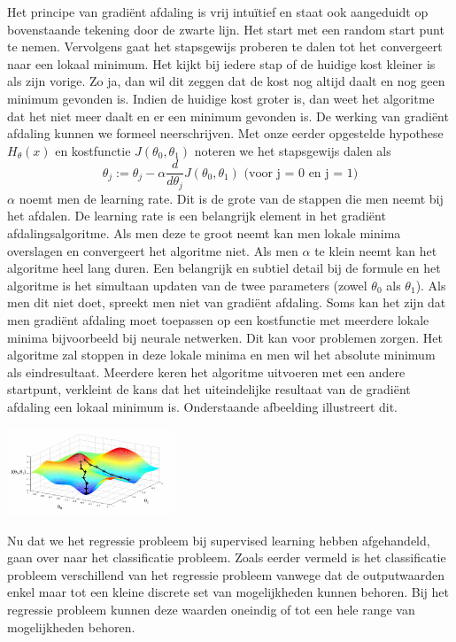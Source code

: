%
 Het principe van gradi\"ent afdaling is vrij intu\"itief en staat ook aangeduidt op bovenstaande tekening door de zwarte lijn. Het start met een random start punt te nemen. Vervolgens gaat het stapsgewijs proberen te dalen tot het convergeert naar een lokaal minimum. Het kijkt bij iedere stap of de huidige kost kleiner is als zijn vorige. Zo ja, dan wil dit zeggen dat de kost nog altijd daalt en nog geen minimum gevonden is. Indien de huidige kost groter is, dan weet het algoritme dat het niet meer daalt en er een minimum gevonden is.
\newline
De werking van gradi\"ent afdaling kunnen we formeel neerschrijven. Met onze eerder opgestelde hypothese $H_{\theta}(x)$ en kostfunctie $J(\theta_{0},\theta_{1})$ noteren we het stapsgewijs dalen als \\
\[ \theta_{j} := \theta_{j} - \alpha\frac{d}{d\theta_{j}}J(\theta_{0},\theta_{1})   \text{  (voor j = 0 en j = 1)}\] 
\newline
$\alpha$ noemt men de learning rate. Dit is de grote van de stappen die men neemt bij het afdalen. De learning rate is een belangrijk element in het gradi\"ent afdalingsalgoritme. Als men deze te groot neemt kan men lokale minima overslagen en convergeert het algoritme niet. Als men $\alpha$  te klein neemt kan het algoritme heel lang duren. 
\newline
Een belangrijk en subtiel detail bij de formule en het algoritme is het simultaan updaten van de twee parameters (zowel $\theta_{0}$ als $\theta_{1}$). Als men dit niet doet, spreekt men niet van gradi\"ent afdaling.
\newline
Soms kan het zijn dat men gradi\"ent afdaling moet toepassen op een kostfunctie met meerdere lokale minima bijvoorbeeld bij neurale netwerken. Dit kan voor problemen zorgen. Het algoritme zal stoppen in deze lokale minima en men wil het absolute minimum als eindresultaat. Meerdere keren het algoritme uitvoeren met een andere startpunt, verkleint de kans dat het uiteindelijke resultaat van de gradi\"ent afdaling een lokaal minimum is. Onderstaande afbeelding illustreert dit.
\begin{center}
  \includegraphics[width=5cm]{3d_plot}
\end{center}
Nu dat we het regressie probleem bij supervised learning hebben afgehandeld, gaan over naar het classificatie probleem. Zoals eerder vermeld is het classificatie probleem verschillend van het regressie probleem vanwege dat de outputwaarden enkel maar tot een kleine discrete set van mogelijkheden kunnen behoren. Bij het regressie probleem kunnen deze waarden oneindig of tot een hele range van mogelijkheden behoren.

